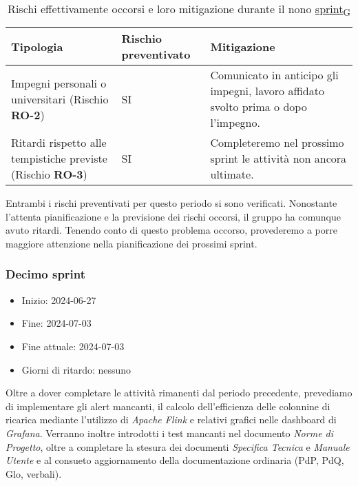 \begin{table}[!h]
    \centering
    \begin{tabular}{ | p{6cm} | p{2.5cm} | p{7.5cm} | }
        \hline
        \textbf{Tipologia} & \textbf{Rischio preventivato} & \textbf{Mitigazione}  \\
        \hline
        Impegni personali o universitari (Rischio \textbf{RO-2})& SI & Comunicato in anticipo gli impegni, lavoro affidato svolto prima o dopo l’impegno. \\
        \hline
		Ritardi rispetto alle tempistiche previste (Rischio \textbf{RO-3}) & SI & Completeremo nel prossimo sprint le attività non ancora ultimate. \\
        \hline
    \end{tabular}
    \caption{Rischi effettivamente occorsi e loro mitigazione durante il nono \href{https://7last.github.io/docs/pb/documentazione-interna/glossario\#sprint}{sprint\textsubscript{G}}}
\end{table}

Entrambi i rischi preventivati per questo periodo si sono verificati. Nonostante l'attenta pianificazione e la previsione dei rischi occorsi, il gruppo ha comunque avuto ritardi. Tenendo conto di questo problema occorso, provederemo a porre maggiore attenzione nella pianificazione dei prossimi sprint.

\newpage
\subsubsection{Decimo sprint}
\begin{itemize}
    \item Inizio: 2024-06-27
    \item Fine: 2024-07-03
    \item Fine attuale: 2024-07-03
    \item Giorni di ritardo: nessuno
\end{itemize}

Oltre a dover completare le attività rimanenti dal periodo precedente, prevediamo di implementare gli alert mancanti, il calcolo dell'efficienza delle colonnine di ricarica mediante l'utilizzo di \textit{Apache Flink} e relativi grafici nelle dashboard di \textit{Grafana}. Verranno inoltre introdotti i test mancanti nel documento \textit{Norme di Progetto}, oltre a completare la stesura dei documenti \textit{Specifica Tecnica} e \textit{Manuale Utente} e al consueto aggiornamento della documentazione ordinaria (PdP, PdQ, Glo, verbali).

